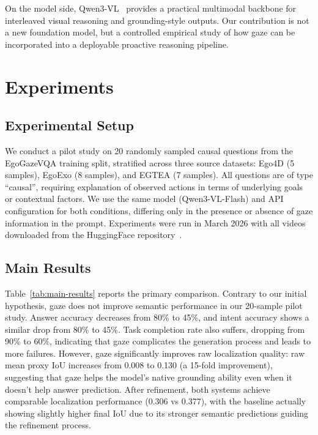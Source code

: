 \documentclass[11pt]{article}
\begin{document}
On the model side, Qwen3-VL~\citep{bai2025qwen3vl} provides a practical multimodal backbone for interleaved visual reasoning and grounding-style outputs. Our contribution is not a new foundation model, but a controlled empirical study of how gaze can be incorporated into a deployable proactive reasoning pipeline.

\section{Experiments}

\subsection{Experimental Setup}
We conduct a pilot study on 20 randomly sampled causal questions from the EgoGazeVQA training split, stratified across three source datasets: Ego4D (5 samples), EgoExo (8 samples), and EGTEA (7 samples). All questions are of type ``causal'', requiring explanation of observed actions in terms of underlying goals or contextual factors. We use the same model (Qwen3-VL-Flash) and API configuration for both conditions, differing only in the presence or absence of gaze information in the prompt. Experiments were run in March 2026 with all videos downloaded from the HuggingFace repository~\cite{wolf2020huggingface}.

\subsection{Main Results}
Table~\ref{tab:main-results} reports the primary comparison. Contrary to our initial hypothesis, gaze does not improve semantic performance in our 20-sample pilot study. Answer accuracy decreases from 80\% to 45\%, and intent accuracy shows a similar drop from 80\% to 45\%. Task completion rate also suffers, dropping from 90\% to 60\%, indicating that gaze complicates the generation process and leads to more failures. However, gaze significantly improves raw localization quality: raw mean proxy IoU increases from 0.008 to 0.130 (a 15-fold improvement), suggesting that gaze helps the model's native grounding ability even when it doesn't help answer prediction. After refinement, both systems achieve comparable localization performance (0.306 vs 0.377), with the baseline actually showing slightly higher final IoU due to its stronger semantic predictions guiding the refinement process.
\end{document}
